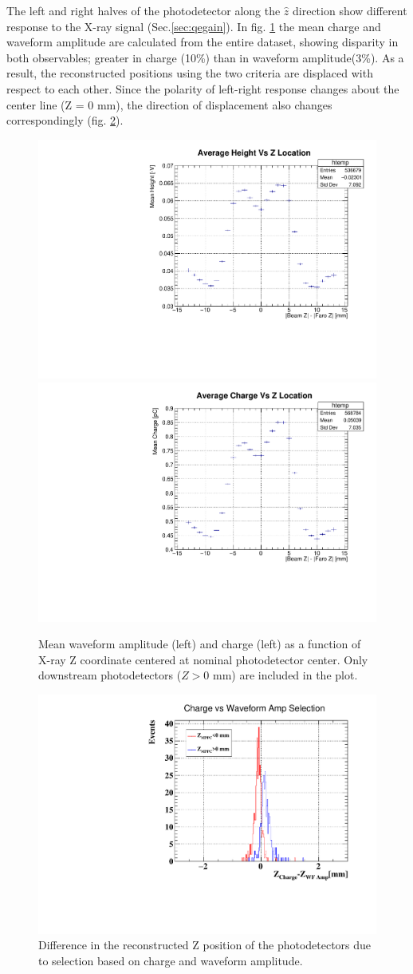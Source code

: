 The left and right halves of the photodetector along the $\hat{z}$ direction
show different response to the X-ray signal (Sec.\ref{sec:qegain}).  In fig.
\ref{fig:mppcleftright} the mean charge and waveform amplitude are calculated
from the entire dataset, showing disparity in both observables; 
greater in charge (10\%) than in waveform amplitude(3\%). 
As a result, the reconstructed positions using the two criteria are 
displaced with respect to each other. Since the polarity of left-right
response changes about the center line (Z = 0 mm), the direction of
displacement also changes correspondingly (fig. \ref{fig:chargevswfamp}).

\begin{figure}[h]
    \centering
    \includegraphics[width=.4\linewidth]{plots/2018/HeightvsZ2}
    \includegraphics[width=.4\linewidth]{plots/2018/ChargevsZ2}
  \caption{Mean waveform amplitude (left) and charge (left) as a function of X-ray Z coordinate centered
    at nominal photodetector center. Only downstream photodetectors ($Z>0$ mm) are included in the plot.}
  \label{fig:mppcleftright}
\end{figure}

\begin{figure}[h]
    \centering
    \includegraphics[width=.4\linewidth]{plots/2018/chargevswfampZ}
  \caption{Difference in the reconstructed Z position of the photodetectors 
   due to selection based on charge and waveform amplitude.}
  \label{fig:chargevswfamp}
\end{figure}



